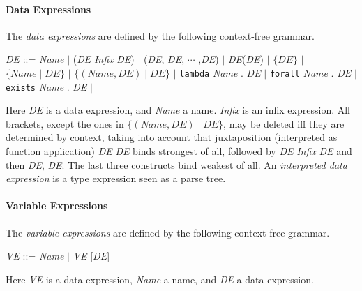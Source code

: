 \documentclass[adraft]{eptcs}
\newcommand{\aac}[1]{{\tt #1}}    %
\begin{document}
\paragraph{Data Expressions}
The \emph{data expressions} are defined by the following context-free grammar.
\begin{center}
\textit{DE} ::= \textit{Name} $|$ (\textit{DE} \textit{Infix} \textit{DE}) $|$
                (\textit{DE}, \textit{DE}, $\cdots$ ,\textit{DE}) $|$ \textit{DE}(\textit{DE}) $|$
               $\{\textit{DE}\}$ $|$
               $\{\textit{Name}\mid \textit{DE}\}$ $|$
               $\{(\textit{Name},\textit{DE})\mid \textit{DE}\}$ $|$
                \aac{lambda} \textit{Name} . \textit{DE} $|$
                \aac{forall} \textit{Name} . \textit{DE} $|$ \aac{exists} \textit{Name} . \textit{DE} $|$
\end{center}
Here \textit{DE} is a data expression, and \textit{Name} a name. \textit{Infix} is an infix expression.
All brackets, except the ones in $\{(\textit{Name},\textit{DE})\mid \textit{DE}\}$, may be
deleted iff they are determined by context, taking into account that juxtaposition (interpreted as
function application) \textit{DE} \textit{DE} binds strongest of all,
followed by \textit{DE} \textit{Infix} \textit{DE}
and then \textit{DE}, \textit{DE}. The last three constructs bind weakest of all.
An \emph{interpreted data expression} is a type expression seen as a parse tree. 

\paragraph{Variable Expressions}
The \emph{variable expressions} are defined by the following context-free grammar.
\begin{center}
\textit{VE} ::= \textit{Name} $|$ \textit{VE} [\textit{DE}]
\end{center}
Here \textit{VE} is a data expression, \textit{Name} a name, and \textit{DE} a data expression.
\end{document}
